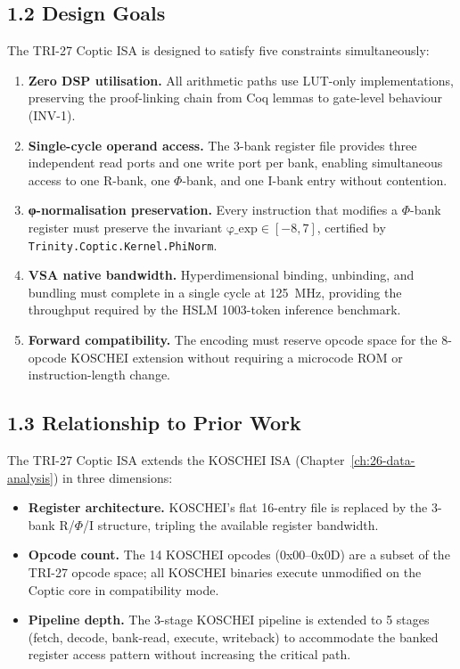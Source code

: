 \subsection{1.2 Design Goals}\label{fa_71:design-goals}

The TRI-27 Coptic ISA is designed to satisfy five constraints
simultaneously:

\begin{enumerate}
\def\labelenumi{C\arabic{enumi}.}
\item
  \textbf{Zero DSP utilisation.} All arithmetic paths use
  LUT-only implementations, preserving the proof-linking
  chain from Coq lemmas to gate-level behaviour (INV-1).
\item
  \textbf{Single-cycle operand access.} The 3-bank register
  file provides three independent read ports and one write
  port per bank, enabling simultaneous access to one R-bank,
  one $\Phi$-bank, and one I-bank entry without contention.
\item
  \textbf{φ-normalisation preservation.} Every instruction
  that modifies a $\Phi$-bank register must preserve the
  invariant \(\text{φ\_exp} \in [-8, 7]\), certified by
  \texttt{Trinity.Coptic.Kernel.PhiNorm}.
\item
  \textbf{VSA native bandwidth.} Hyperdimensional binding,
  unbinding, and bundling must complete in a single cycle at
  125~MHz, providing the throughput required by the HSLM
  1003-token inference benchmark.
\item
  \textbf{Forward compatibility.} The encoding must reserve
  opcode space for the 8-opcode KOSCHEI extension without
  requiring a microcode ROM or instruction-length change.
\end{enumerate}

\subsection{1.3 Relationship to Prior Work}\label{fa_71:relationship}

The TRI-27 Coptic ISA extends the KOSCHEI ISA (Chapter~\ref{ch:26-data-analysis})
in three dimensions:

\begin{itemize}
\tightlist
\item
  \textbf{Register architecture.} KOSCHEI's flat 16-entry file
  is replaced by the 3-bank R/$\Phi$/I structure, tripling
  the available register bandwidth.
\item
  \textbf{Opcode count.} The 14 KOSCHEI opcodes (0x00--0x0D)
  are a subset of the TRI-27 opcode space; all KOSCHEI binaries
  execute unmodified on the Coptic core in compatibility mode.
\item
  \textbf{Pipeline depth.} The 3-stage KOSCHEI pipeline is
  extended to 5 stages (fetch, decode, bank-read, execute,
  writeback) to accommodate the banked register access pattern
  without increasing the critical path.
\end{itemize}

